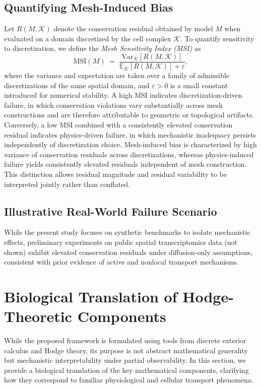 \documentclass[10pt,article]{article}
\begin{document}
\subsection{Quantifying Mesh-Induced Bias}
Let $R(M,\mathcal{K})$ denote the conservation residual obtained by model $M$ when evaluated on a domain discretized by the cell complex $\mathcal{K}$.  
To quantify sensitivity to discretization, we define the \emph{Mesh Sensitivity Index (MSI)} as
\begin{equation}
\mathrm{MSI}(M) \;=\;
\frac{\mathrm{Var}_{\mathcal{K}}\!\left[ R(M,\mathcal{K}) \right]}
{\mathbb{E}_{\mathcal{K}}\!\left[ R(M,\mathcal{K}) \right] + \varepsilon},
\end{equation}
where the variance and expectation are taken over a family of admissible discretizations of the same spatial domain, and $\varepsilon > 0$ is a small constant introduced for numerical stability.
A high MSI indicates discretization-driven failure, in which conservation violations vary substantially across mesh constructions and are therefore attributable to geometric or topological artifacts.  
Conversely, a low MSI combined with a consistently elevated conservation residual indicates physics-driven failure, in which mechanistic inadequacy persists independently of discretization choice.
Mesh-induced bias is characterized by high variance of conservation residuals across discretizations, whereas physics-induced failure yields consistently elevated residuals independent of mesh construction. This distinction allows residual magnitude and residual variability to be interpreted jointly rather than conflated.

\subsection{Illustrative Real-World Failure Scenario}
While the present study focuses on synthetic benchmarks to isolate mechanistic effects, preliminary experiments on public spatial transcriptomics data (not shown) exhibit elevated conservation residuals under diffusion-only assumptions, consistent with prior evidence of active and nonlocal transport mechanisms.

\section{Biological Translation of Hodge-Theoretic Components}
While the proposed framework is formulated using tools from discrete exterior calculus and Hodge theory, its purpose is not abstract mathematical generality but mechanistic interpretability under partial observability. In this section, we provide a biological translation of the key mathematical components, clarifying how they correspond to familiar physiological and cellular transport phenomena.
\end{document}

